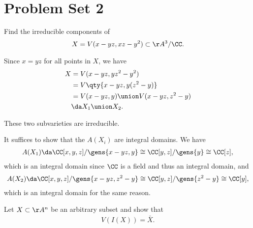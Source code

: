 \hypertarget{problem-set-2}{%
\section{Problem Set 2}\label{problem-set-2}}

\begin{exercise}[Gathmann 2.17]

Find the irreducible components of
\begin{align*}  
X = V(x - yz, xz - y^2) \subset \AA^3/\CC
.\end{align*}

\end{exercise}

\begin{solution}

Since \(x=yz\) for all points in \(X\), we have
\begin{align*}  
X &= V(x-yz, yz^2 - y^2) \\
&= V\qty{x-yz, y(z^2 - y) } \\
&= V(x-yz, y) \union V(x-yz, z^2-y) \\
&\da X_1 \union X_2
.\end{align*}

\begin{claim}

These two subvarieties are irreducible.

\end{claim}

It suffices to show that the \(A(X_i)\) are integral domains. We have
\begin{align*}  
A(X_1) \da \CC[x,y,z] / \gens{x-yz, y} \cong \CC[y,z]/\gens{y} \cong \CC[z]
,\end{align*} which is an integral domain since \(\CC\) is a field and
thus an integral domain, and
\begin{align*}  
A(X_2) \da \CC[x,y,z]/\gens{x-yz, z^2 - y} \cong \CC[y,z]/\gens{z^2-y} \cong \CC[y]
,\end{align*} which is an integral domain for the same reason.

\end{solution}

\begin{exercise}[Gathmann 2.18]

Let \(X\subset \AA^n\) be an arbitrary subset and show that
\begin{align*}  
V(I(X)) = \bar{X}
.\end{align*}

\end{exercise}

